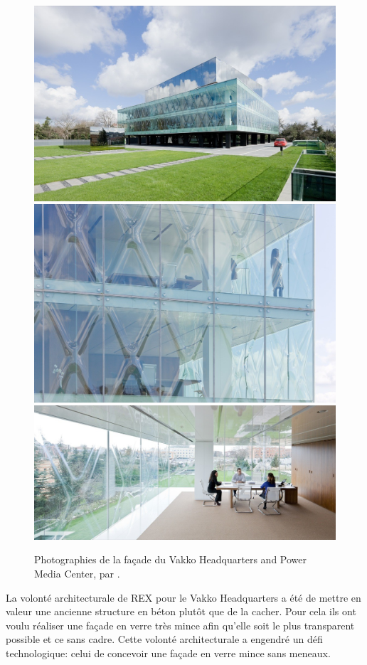 \documentclass[11pt,titlepage]{article}
\begin{document}
\begin{figure}[H]
    \centering
    \includegraphics[height=0.324\linewidth]{img/bulle/Vakko_ext2.jpg}\hfill
    \includegraphics[height=0.324\linewidth]{img/bulle/Vakko_ext.jpg}
    \\[\smallskipamount]
    \includegraphics[width=\linewidth]{img/bulle/Vakko_int.jpg}
    \caption{Photographies de la façade du Vakko Headquarters and Power Media Center, par \Textcite{VekkoHQ}.}
    \label{fig:VakkoHQ}
\end{figure}

La volonté architecturale de REX pour le Vakko Headquarters a été de mettre en valeur une ancienne structure en béton plutôt que de la cacher. Pour cela ils ont voulu réaliser une façade en verre très mince afin qu'elle soit le plus transparent possible et ce sans cadre. Cette volonté architecturale a engendré un défi technologique: celui de concevoir une façade en verre mince sans meneaux. 
\end{document}
